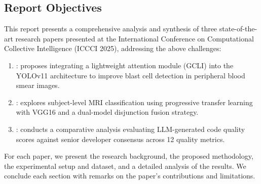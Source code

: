 \subsection{Report Objectives}

This report presents a comprehensive analysis and synthesis of three state-of-the-art research papers presented at the International Conference on Computational Collective Intelligence (ICCCI 2025), addressing the above challenges:
\begin{enumerate}
    \item {} \cite{leukemia_gcli_2025}: proposes integrating a lightweight attention module (GCLI) into the YOLOv11 architecture to improve blast cell detection in peripheral blood smear images.
    \item {} \cite{alzheimer_vgg_2025}: explores subject-level MRI classification using progressive transfer learning with VGG16 and a dual-model disjunction fusion strategy.
    \item {} \cite{llm_review_2025}: conducts a comparative analysis evaluating LLM-generated code quality scores against senior developer consensus across 12 quality metrics.
\end{enumerate}

For each paper, we present the research background, the proposed methodology, the experimental setup and dataset, and a detailed analysis of the results. We conclude each section with remarks on the paper's contributions and limitations.
